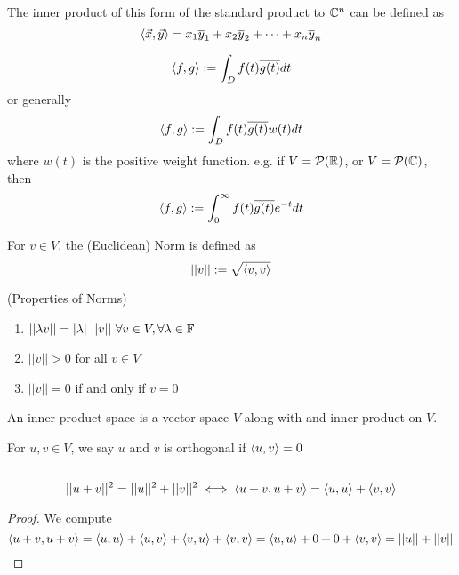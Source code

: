 \begin{remark}[Generalization to $\b C^n$]
    The inner product of this form of the standard product to $\b C^n$ can be defined as
    \[ \langle \vec x, \vec y \rangle = x_1\overline y_1 + x_2\overline y_2 + \cdots + x_n\overline y_n\]
\end{remark}
\begin{remark}
    \[ \langle f, g \rangle : = \int_D f(t)\overline{g(t)} dt\]
    or generally \[ \langle f, g \rangle : = \int_D f(t)\overline{g(t)}w(t) dt\]
    where $w(t)$ is the positive weight function. e.g. if $V = \mathcal P(\mathbb R)$, or $V = \mathcal P(\mathbb C)$, then 
    \[ \langle f, g \rangle : = \int_0^\infty f(t)\overline{g(t)}e^{-t} dt\]
\end{remark}
\begin{definition}
    For $v \in V$, the (Euclidean) Norm is defined as
    \[ ||v|| : = \sqrt{\langle v,v \rangle}\] 
\end{definition}
\begin{theorem}(Properties of Norms)
    \begin{enumerate}
        \item $||\lambda v || = |\lambda| \ ||v|| \ \forall v \in V, \forall \lambda \in \b F $
        \item $||v|| > 0$ for all $v \in V$
        \item $||v|| = 0$ if and only if $v = 0$ 
    \end{enumerate}
\end{theorem}
\begin{definition}
    An inner product space is a vector space $V$ along with and inner product on $V$.
\end{definition}
\begin{definition}
    For $u,v \in V$, we say $u$ and $v$ is orthogonal if $\langle u, v\rangle = 0$
\end{definition}
\begin{theorem} $ $
\begin{center}
\end{center}
\[ ||u + v||^2 = ||u||^2 + ||v||^2 \iff \langle u + v, u + v\rangle = \langle u,u \rangle + \langle v,v \rangle \]
\end{theorem}
\begin{proof} We compute
    \[ \langle u + v, u + v\rangle = \langle u,u \rangle + \langle u , v \rangle + \langle v, u \rangle + \langle v,v \rangle = \langle u,u \rangle + 0 + 0 + \langle v,v \rangle = ||u|| + ||v|| \]
\end{proof}
